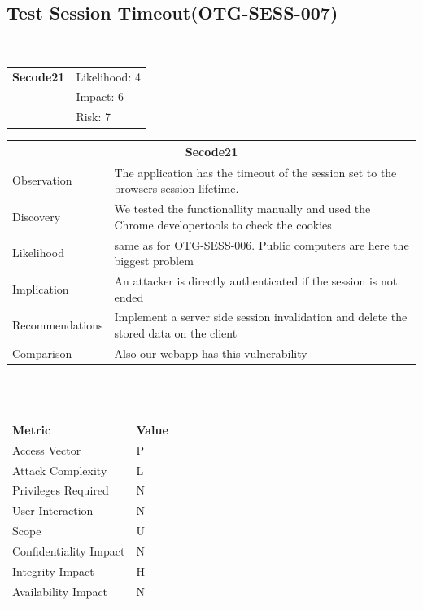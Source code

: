 \documentclass[headsepline,footsepline,footinclude=false,oneside,fontsize=11pt,paper=a4,listof=totoc,bibliography=totoc]{scrbook} %
\begin{document}
\pagebreak
\subsection{Test Session Timeout(OTG-SESS-007)}\

\begin{tabular}{cR{12cm}}
	\textbf{Secode21} & Likelihood: 4\\& Impact: 6\\& Risk: 7
\end{tabular}

\begin{tabular}{ l|p{11cm}  }
	\hline
	\multicolumn{2}{c}{\textbf{Secode21}} \\
	\hline
	Observation & The application has the timeout of the session set to the browsers
	session lifetime.\\
	Discovery & We tested the functionallity manually and used the Chrome developertools to check the cookies\\
	Likelihood & same as for OTG-SESS-006. Public computers are here the biggest problem\\
	Implication & An attacker is directly authenticated if the session is not ended\\
	Recommendations & Implement a server side session invalidation and delete the stored data on the client\\
	Comparison & Also our webapp has this vulnerability\\
	\hline
\end{tabular}
\\
\vspace{0.5cm}
\\
\begin{center}
	\begin{tabular}{ll}
		\rowcolor[HTML]{34CDF9}
		{\color[HTML]{ECF4FF} \textbf{Metric}}        & {\color[HTML]{ECF4FF} \textbf{Value}} \\
		\rowcolor[HTML]{BBDAFF}
		{\color[HTML]{333333} Access Vector}          & {\color[HTML]{333333} } P             \\
		\rowcolor[HTML]{ECF4FF}
		{\color[HTML]{333333} Attack Complexity}      & {\color[HTML]{333333} } L              \\
		\rowcolor[HTML]{BBDAFF}
		{\color[HTML]{333333} Privileges Required}    & {\color[HTML]{333333} } N              \\
		\rowcolor[HTML]{ECF4FF}
		{\color[HTML]{333333} User Interaction}       & {\color[HTML]{333333} } N              \\
		\rowcolor[HTML]{BBDAFF}
		{\color[HTML]{333333} Scope}                  & {\color[HTML]{333333} } U              \\
		\rowcolor[HTML]{ECF4FF}
		{\color[HTML]{333333} Confidentiality Impact} & {\color[HTML]{333333} } N              \\
		\rowcolor[HTML]{BBDAFF}
		{\color[HTML]{333333} Integrity Impact}       & {\color[HTML]{333333} } H              \\
		\rowcolor[HTML]{ECF4FF}
		{\color[HTML]{333333} Availability Impact}    & {\color[HTML]{333333} } N
	\end{tabular}
\end{center}
\end{document}
